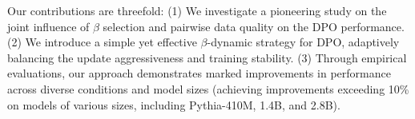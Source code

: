 Our contributions are threefold: (1) We investigate a pioneering study on the joint influence of $\beta$ selection and pairwise data quality on the DPO performance. (2) We introduce a simple yet effective $\beta$-dynamic strategy for DPO, adaptively balancing the update aggressiveness and training stability. (3) Through empirical evaluations, our approach demonstrates marked improvements in performance across diverse conditions and model sizes
(\eg achieving improvements exceeding 10\% on models of various sizes, including Pythia-410M, 1.4B, and 2.8B).






